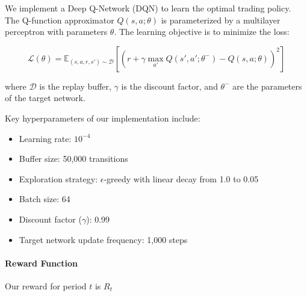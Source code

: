 \documentclass[12pt,a4paper]{article}
\begin{document}




\Vhrulefill

We implement a Deep Q-Network (DQN) to learn the optimal trading policy. The Q-function approximator $Q(s, a; \theta)$ is parameterized by a multilayer perceptron with parameters $\theta$. The learning objective is to minimize the loss:

$$\mathcal{L}(\theta) = \mathbb{E}_{(s, a, r, s') \sim \mathcal{D}} \left[ \left( r + \gamma \max_{a'} Q(s', a'; \theta^-) - Q(s, a; \theta) \right)^2 \right]$$

where $\mathcal{D}$ is the replay buffer, $\gamma$ is the discount factor, and $\theta^-$ are the parameters of the target network.

Key hyperparameters of our implementation include:

\begin{itemize}[font=\normalfont\color{black}, %
				  leftmargin=0pt, %
				  align=right, %
				  labelwidth=0cm,
				  labelsep=0.2cm,
				  itemsep=0pt,
				  topsep=0pt]
  \item Learning rate: $10^{-4}$
  \item Buffer size: 50,000 transitions
  \item Exploration strategy: $\epsilon$-greedy with linear decay from 1.0 to 0.05
  \item Batch size: 64
  \item Discount factor ($\gamma$): 0.99
  \item Target network update frequency: 1,000 steps
\end{itemize}

\paragraph{Reward Function}

Our reward for period $t$ is $R_t$
\end{document}
